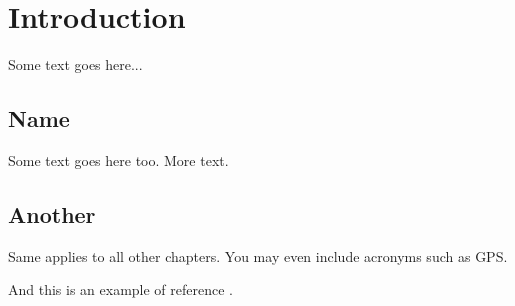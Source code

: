 \chapter{Introduction} 

Some text goes here...

\section{Name}

Some text goes here too. More text.

\section{Another}

Same applies to all other chapters. You may even include acronyms such as \ac{GPS}.

And this is an example of reference \cite{shehory_methods_1998}.